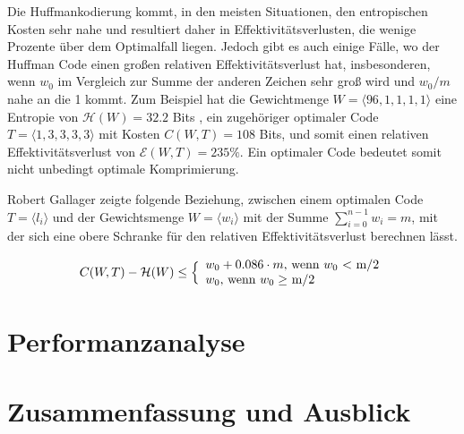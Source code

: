 \documentclass[course=erap]{aspdoc}
\begin{document}
Die Huffmankodierung kommt, in den meisten Situationen, den entropischen Kosten sehr nahe und resultiert daher in Effektivitätsverlusten, die wenige Prozente über dem Optimalfall liegen.
Jedoch gibt es auch einige Fälle, wo der Huffman Code einen großen relativen Effektivitätsverlust hat, insbesonderen, wenn $w_0$ im Vergleich zur Summe der anderen Zeichen sehr groß wird und $w_0 / m$ nahe an die 1 kommt.
Zum Beispiel hat die Gewichtmenge $W = \langle 96, 1, 1, 1, 1 \rangle$ eine Entropie von $\mathcal{H}(W) =
32.2$ Bits , ein zugehöriger optimaler Code $T = \langle 1, 3, 3, 3, 3 \rangle$ mit Kosten $C(W ,T) = 108 $ Bits, und somit einen
relativen Effektivitätsverlust von $\mathcal{E}(W ,T ) = 235\%$. Ein optimaler Code bedeutet somit nicht unbedingt optimale Komprimierung.

Robert Gallager \cite{1055959} zeigte folgende Beziehung, zwischen einem optimalen Code $T = \langle l_i \rangle $ und der Gewichtsmenge $W = \langle w_i \rangle$ mit der Summe $\sum_{i=0}^{n-1} w_i = m$, mit der sich eine obere Schranke für den relativen Effektivitätsverlust berechnen lässt.

$$ C(W, T) - \mathcal{H}(W) \le \Bigl\lbrace
    \begin{array}{l}
          w_0 + 0.086 \cdot m \textrm{, wenn $w_0$ < m/2}\\
          w_0 \textrm{, wenn $w_0 \ge$ m/2}\\
    \end{array} $$

\section{Performanzanalyse}


\section{Zusammenfassung und Ausblick}


{}
\end{document}

